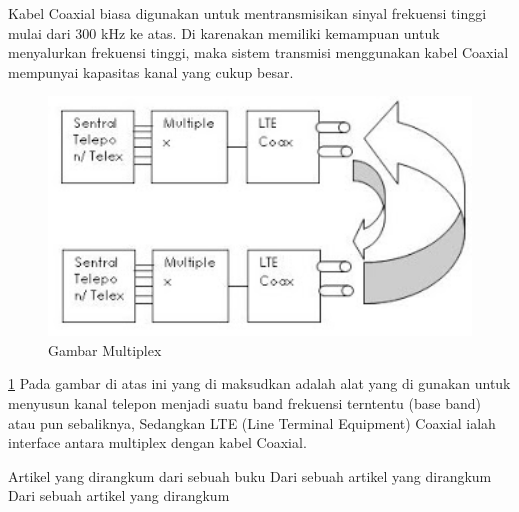 	Kabel Coaxial biasa digunakan untuk mentransmisikan sinyal frekuensi tinggi mulai dari 300 kHz ke atas. Di karenakan memiliki kemampuan untuk menyalurkan frekuensi tinggi, maka sistem transmisi menggunakan kabel Coaxial mempunyai kapasitas kanal yang cukup besar.
	
\begin{figure} [ht]
	\centerline{\includegraphics[width=1\textwidth]{figures/multiplex.JPG}}
	\caption{Gambar Multiplex}
	\label{multiplex}
\end{figure}	
	\ref{multiplex}
	Pada gambar di atas ini yang di maksudkan adalah alat yang di gunakan untuk menyusun kanal telepon menjadi suatu band frekuensi terntentu (base band) atau pun sebaliknya, Sedangkan LTE (Line Terminal Equipment) Coaxial ialah interface antara multiplex dengan kabel Coaxial.


	
Artikel yang dirangkum dari sebuah buku \cite{syafrizal2005pengantar}
Dari sebuah artikel yang dirangkum \cite{kelik2003pengantar}
Dari sebuah artikel yang dirangkum \cite{beveridge1995method}
